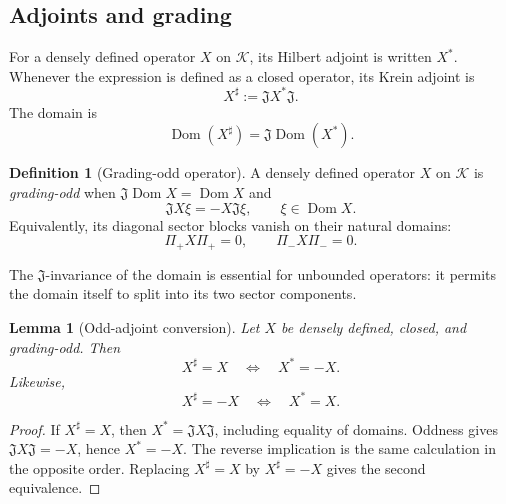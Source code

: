 \documentclass[11pt,reqno]{scrartcl}
\newcommand{\scrK}{\mathscr K}
\newcommand{\fundJ}{\mathfrak J}
\newcommand{\Pp}{\Pi_{+}}
\newcommand{\Pm}{\Pi_{-}}
\DeclareMathOperator{\Dom}{Dom}
\theoremstyle{plain}
\newtheorem{lemma}[lemma]{Lemma}
\theoremstyle{definition}
\newtheorem{definition}[definition]{Definition}
\theoremstyle{remark}
\begin{document}
\subsection{Adjoints and grading}

For a densely defined operator \(X\) on \(\scrK\), its Hilbert adjoint is
written \(X^*\). Whenever the expression is defined as a closed operator, its
Krein adjoint is
\begin{equation}
  X^\sharp:=\fundJ X^*\fundJ.
  \label{eq:Krein-adjoint}
\end{equation}
The domain is
\begin{equation}
  \Dom(X^\sharp)=\fundJ\Dom(X^*).
\end{equation}

\begin{definition}[Grading-odd operator]
A densely defined operator \(X\) on \(\scrK\) is \emph{grading-odd} when
\(\fundJ\Dom X=\Dom X\) and
\begin{equation}
  \fundJ X\xi=-X\fundJ\xi,
  \qquad \xi\in\Dom X.
  \label{eq:odd}
\end{equation}
Equivalently, its diagonal sector blocks vanish on their natural domains:
\begin{equation}
  \Pp X\Pp=0,
  \qquad
  \Pm X\Pm=0.
\end{equation}
\end{definition}

The \(\fundJ\)-invariance of the domain is essential for unbounded operators:
it permits the domain itself to split into its two sector components.

\begin{lemma}[Odd-adjoint conversion]
\label{lem:odd-adjoint}
Let \(X\) be densely defined, closed, and grading-odd. Then
\begin{equation}
  X^\sharp=X
  \quad\Longleftrightarrow\quad
  X^*=-X.
  \label{eq:odd-adjoint-conversion}
\end{equation}
Likewise,
\begin{equation}
  X^\sharp=-X
  \quad\Longleftrightarrow\quad
  X^*=X.
  \label{eq:odd-adjoint-conversion-2}
\end{equation}
\end{lemma}

\begin{proof}
If \(X^\sharp=X\), then \(X^*=\fundJ X\fundJ\), including equality of
domains. Oddness gives \(\fundJ X\fundJ=-X\), hence \(X^*=-X\). The reverse
implication is the same calculation in the opposite order. Replacing
\(X^\sharp=X\) by \(X^\sharp=-X\) gives the second equivalence.
\end{proof}
\end{document}

